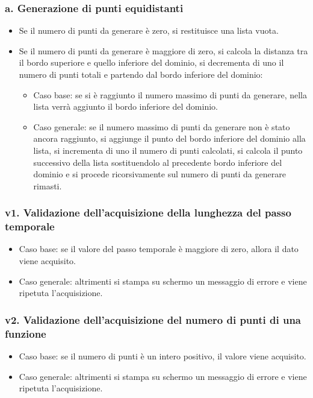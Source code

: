 \subsubsection*{a. Generazione di punti equidistanti}
\begin{itemize}
\item Se il numero di punti da generare è zero, si restituisce una lista vuota.
\item Se il numero di punti da generare è maggiore di zero, si calcola la distanza tra il bordo superiore e quello inferiore del dominio, si decrementa di uno il numero di punti totali e partendo dal bordo inferiore del dominio:
\begin{itemize}
\item Caso base: se si è raggiunto il numero massimo di punti da generare, nella lista verrà aggiunto il bordo inferiore del dominio.
\item Caso generale: se il numero massimo di punti da generare non è stato ancora raggiunto, si aggiunge il punto del bordo inferiore del dominio alla lista, si incrementa di uno il numero di punti calcolati, si calcola il punto successivo della lista sostituendolo al precedente bordo inferiore del dominio e si procede ricorsivamente sul numero di punti da generare rimasti.
\end{itemize}
\end{itemize}

\subsubsection*{v1. Validazione dell'acquisizione della lunghezza del passo temporale}
\begin{itemize}
\item Caso base: se il valore del passo temporale è maggiore di zero, allora il dato viene acquisito.
\item Caso generale: altrimenti si stampa su schermo un messaggio di errore e viene ripetuta l'acquisizione.
\end{itemize}

\subsubsection*{v2. Validazione dell'acquisizione del numero di punti di una funzione}
\begin{itemize}
\item Caso base: se il numero di punti è un intero positivo, il valore viene acquisito.
\item Caso generale: altrimenti si stampa su schermo un messaggio di errore e viene ripetuta l'acquisizione.
\end{itemize}





